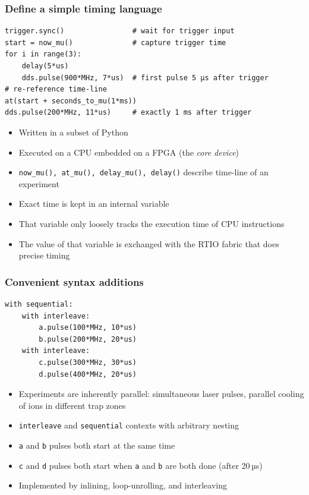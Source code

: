 \documentclass[final,presentation,compress]{beamer}
\begin{document}
\begin{frame}[fragile]
  \frametitle{Define a simple timing language}
  \footnotesize

  \begin{verbatim}
trigger.sync()                # wait for trigger input
start = now_mu()              # capture trigger time
for i in range(3):
    delay(5*us)
    dds.pulse(900*MHz, 7*us)  # first pulse 5 µs after trigger
# re-reference time-line
at(start + seconds_to_mu(1*ms))
dds.pulse(200*MHz, 11*us)     # exactly 1 ms after trigger
  \end{verbatim}

  \begin{itemize}
    \item Written in a subset of Python
    \item Executed on a CPU embedded on a FPGA (the \emph{core device})
    \item \verb!now_mu(), at_mu(), delay_mu(), delay()! describe time-line of an experiment
    \item Exact time is kept in an internal variable
    \item That variable only loosely tracks the execution time of CPU instructions
    \item The value of that variable is exchanged with the RTIO fabric that
      does precise timing
  \end{itemize}
\end{frame}


\begin{frame}[fragile]
  \frametitle{Convenient syntax additions}
  \footnotesize
  \begin{verbatim}
with sequential:
    with interleave:
        a.pulse(100*MHz, 10*us)
        b.pulse(200*MHz, 20*us)
    with interleave:
        c.pulse(300*MHz, 30*us)
        d.pulse(400*MHz, 20*us)
  \end{verbatim}

  \begin{itemize}
    \item Experiments are inherently parallel:
        simultaneous laser pulses, parallel cooling of ions in different trap zones
    \item \verb!interleave! and \verb!sequential! contexts with arbitrary nesting
    \item \verb!a! and \verb!b! pulses both start at the same time
    \item \verb!c! and \verb!d! pulses both start when \verb!a! and \verb!b! are both done
      (after 20\,µs)
    \item Implemented by inlining, loop-unrolling, and interleaving
  \end{itemize}
\end{frame}
\end{document}
